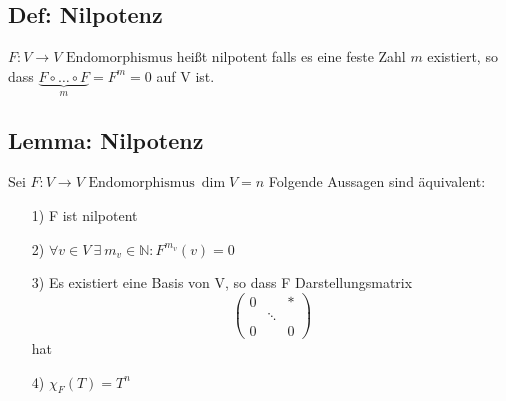 \documentclass[titlepage,12pt,a4paper,ngerman]{report}
\newcommand{\enph}{F: V \to V \textrm{ Endomorphismus}}
\begin{document}
\subsection{Def: Nilpotenz}
$\enph$ heißt nilpotent falls es eine feste Zahl $m$ existiert, so dass $\underbrace{F\circ \dots \circ F}_{m} = F^m = 0$ auf V ist.
\subsection{Lemma: Nilpotenz}
Sei $\enph \ \dim V = n$ Folgende Aussagen sind äquivalent:
\begin{itemize}
	\item[1)] F ist nilpotent
	\item[2)] $\forall v \in V \ \exists \ m_v \in \mathbb{N}: F^{m_v}(v) = 0$
	\item[3)] Es existiert eine Basis von V, so dass F Darstellungsmatrix $$\begin{pmatrix}
	0 & & *\\
	& \ddots \\
	0 & & 0
	\end{pmatrix}$$ hat
	\item[4)] $\chi_F(T) = T^n$
\end{itemize}
\end{document}
